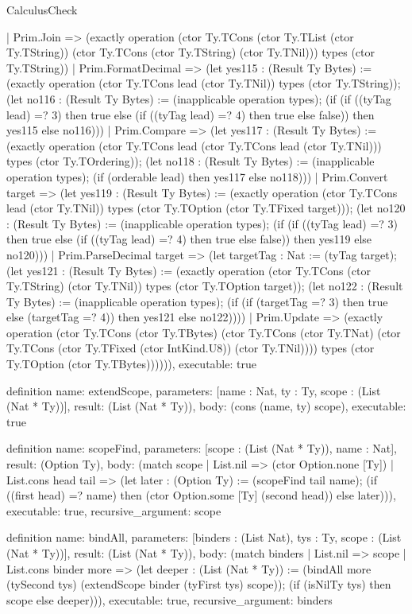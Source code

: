 \begin{lexlean}{CalculusCheck}
\begin{semanticmodule}
{    | Prim.Join => (exactly operation (ctor Ty.TCons (ctor Ty.TList (ctor Ty.TString)) (ctor Ty.TCons (ctor Ty.TString) (ctor Ty.TNil))) types (ctor Ty.TString))
    | Prim.FormatDecimal => (let yes115 : (Result Ty Bytes) := (exactly operation (ctor Ty.TCons lead (ctor Ty.TNil)) types (ctor Ty.TString)); (let no116 : (Result Ty Bytes) := (inapplicable operation types); (if (if ((tyTag lead) =? 3) then true else (if ((tyTag lead) =? 4) then true else false)) then yes115 else no116)))
    | Prim.Compare => (let yes117 : (Result Ty Bytes) := (exactly operation (ctor Ty.TCons lead (ctor Ty.TCons lead (ctor Ty.TNil))) types (ctor Ty.TOrdering)); (let no118 : (Result Ty Bytes) := (inapplicable operation types); (if (orderable lead) then yes117 else no118)))
    | Prim.Convert target => (let yes119 : (Result Ty Bytes) := (exactly operation (ctor Ty.TCons lead (ctor Ty.TNil)) types (ctor Ty.TOption (ctor Ty.TFixed target))); (let no120 : (Result Ty Bytes) := (inapplicable operation types); (if (if ((tyTag lead) =? 3) then true else (if ((tyTag lead) =? 4) then true else false)) then yes119 else no120)))
    | Prim.ParseDecimal target => (let targetTag : Nat := (tyTag target); (let yes121 : (Result Ty Bytes) := (exactly operation (ctor Ty.TCons (ctor Ty.TString) (ctor Ty.TNil)) types (ctor Ty.TOption target)); (let no122 : (Result Ty Bytes) := (inapplicable operation types); (if (if (targetTag =? 3) then true else (targetTag =? 4)) then yes121 else no122))))
    | Prim.Update => (exactly operation (ctor Ty.TCons (ctor Ty.TBytes) (ctor Ty.TCons (ctor Ty.TNat) (ctor Ty.TCons (ctor Ty.TFixed (ctor IntKind.U8)) (ctor Ty.TNil)))) types (ctor Ty.TOption (ctor Ty.TBytes)))))),
  executable: true
}

definition{
  name: extendScope,
  parameters: [name : Nat, ty : Ty, scope : (List (Nat * Ty))],
  result: (List (Nat * Ty)),
  body: (cons (name, ty) scope),
  executable: true
}

definition{
  name: scopeFind,
  parameters: [scope : (List (Nat * Ty)), name : Nat],
  result: (Option Ty),
  body: (match scope
    | List.nil => (ctor Option.none [Ty])
    | List.cons head tail => (let later : (Option Ty) := (scopeFind tail name); (if ((first head) =? name) then (ctor Option.some [Ty] (second head)) else later))),
  executable: true,
  recursive_argument: scope
}

definition{
  name: bindAll,
  parameters: [binders : (List Nat), tys : Ty, scope : (List (Nat * Ty))],
  result: (List (Nat * Ty)),
  body: (match binders
    | List.nil => scope
    | List.cons binder more => (let deeper : (List (Nat * Ty)) := (bindAll more (tySecond tys) (extendScope binder (tyFirst tys) scope)); (if (isNilTy tys) then scope else deeper))),
  executable: true,
  recursive_argument: binders
}


\end{semanticmodule}
\end{lexlean}
